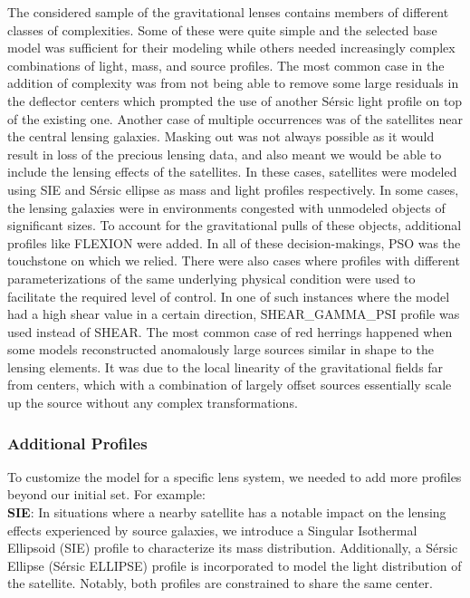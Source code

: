 \documentclass{aa}
\begin{document}
The considered sample of the gravitational lenses contains members of different classes of complexities. Some of these were quite simple and the selected base model was sufficient for their modeling while others needed increasingly complex combinations of light, mass, and source profiles. 
The most common case in the addition of complexity was from not being able to remove some large residuals in the deflector centers which prompted the use of another S\'ersic light profile on top of the existing one. Another case of multiple occurrences was of the satellites near the central lensing galaxies. Masking out was not always possible as it would result in loss of the precious lensing data, and also meant we would be able to include the lensing effects of the satellites. In these cases, satellites were modeled using SIE and S\'ersic ellipse as mass and light profiles respectively. In some cases, the lensing galaxies were in environments congested with unmodeled objects of significant sizes. To account for the gravitational pulls of these objects, additional profiles like FLEXION were added. In all of these decision-makings, PSO was the touchstone on which we relied. There were also cases where profiles with different parameterizations of the same underlying physical condition were used to facilitate the required level of control. In one of such instances where the model had a high shear value in a certain direction, SHEAR\_GAMMA\_PSI profile was used instead of SHEAR.
The most common case of red herrings happened when some models reconstructed anomalously large sources similar in shape to the lensing elements. It was due to the local linearity of the gravitational fields far from centers, which with a combination of largely offset sources essentially scale up the source without any complex transformations.

\subsubsection{Additional Profiles}
To customize the model for a specific lens system, we needed to add more profiles beyond our initial set. For example: \\

\textbf{SIE}: In situations where a nearby satellite has a notable impact on the lensing effects experienced by source galaxies, we introduce a Singular Isothermal Ellipsoid (SIE) profile to characterize its mass distribution. Additionally, a S\'ersic Ellipse (S\'ersic ELLIPSE) profile is incorporated to model the light distribution of the satellite. Notably, both profiles are constrained to share the same center.\\
\end{document}
